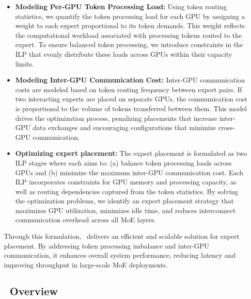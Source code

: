 \begin{itemize}[leftmargin=*]
    \vspace{-0.5em}
    \item \textbf{Modeling Per-GPU Token Processing Load:}
    Using token routing statistics, we quantify the token processing load for each GPU by assigning a weight to each expert proportional to its token demands. This weight reflects the computational workload associated with processing tokens routed to the expert. To ensure balanced token processing, we introduce constraints in the ILP that evenly distribute these loads across GPUs within their capacity limits.
    \vspace{-0.5em}
    \item \textbf{Modeling Inter-GPU Communication Cost:}
    Inter-GPU communication costs are modeled based on token routing frequency between expert pairs. If two interacting experts are placed on separate GPUs, the communication cost is proportional to the volume of tokens transferred between them. This model drives the optimization process, penalizing placements that increase inter-GPU data exchanges and encouraging configurations that minimize cross-GPU communication.
    \vspace{-0.5em}
    \item \textbf{Optimizing expert placement:}
    The expert placement is formulated as two ILP stages where each aims to: (a) balance token processing loads across GPUs and (b) minimize the maximum inter-GPU communication cost. Each ILP incorporates constraints for GPU memory and processing capacity, as well as routing dependencies captured from the token statistics. By solving the optimization problems, we identify an expert placement strategy that maximizes GPU utilization, minimizes idle time, and reduces interconnect communication overhead across all MoE layers.
    \vspace{-0.5em}
\end{itemize}

Through this formulation, \expertune~delivers an efficient and scalable solution for expert placement. By addressing token processing imbalance and inter-GPU communication, it enhances overall system performance, reducing latency and improving throughput in large-scale MoE deployments.


\subsection{\expertune~Overview}~\label{subsec:designoverview}
\vspace{-3ex}

